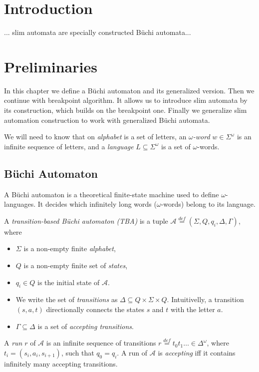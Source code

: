 \documentclass[
	digital
nolof, nolot
]{fithesis3}
\newcommand{\cA}{\mathcal{A}}
\newcommand{\eqdef}{\overset{def}{=}}
\begin{document}
	\chapter{Introduction}
	... slim automata are specially constructed Büchi automata...
	\chapter{Preliminaries}
		In this chapter we define a Büchi automaton and its generalized version.
		Then we continue with breakpoint algorithm. It allows us to introduce slim automata by its construction, which builds on the breakpoint one. Finally we generalize slim automation construction to work with generalized Büchi automata.
		
		We will need to know that on \emph{alphabet} is a set of letters, an \emph{$\omega$-word} $w \in \Sigma^\omega$ is an infinite sequence of letters, and a \emph{language} $L \subseteq \Sigma^\omega$ is a set of $\omega$-words.
		\section{Büchi Automaton}
			A Büchi automaton is a theoretical finite-state machine used to define $\omega$-languages. It decides which infinitely long words ($\omega$-words) belong to its language.
			
			A \emph{transition-based Büchi automaton (TBA)} is a tuple $\cA\eqdef(\Sigma, Q, q_i, \Delta, \Gamma)$, where 
			\begin{itemize}
				\item $\Sigma$ is a non-empty finite \emph{alphabet},
				\item $Q$ is a non-empty finite set of \emph{states},
				\item $q_i \in Q$ is the initial state of $\cA$.
				\item We write the set of \emph{transitions} as $\Delta \subseteq Q \times \Sigma \times Q$. Intuitivelly, a transition $(s, a, t)$  directionally connects the states $s$ and $t$ with the letter $a$.
				\item $\Gamma \subseteq \Delta$ is a set of \emph{accepting transitions}.
			\end{itemize}
			
			A \emph{run} $r$ of $\cA$ is an infinite sequence of transitions
			$r\eqdef t_0t_1\ldots\in\Delta^\omega$, where $t_i=(s_i, a_i,s_{i+1})$,
			 such that $q_0=q_i$.
			A run of $\cA$ is \emph{accepting} iff it contains infinitely many accepting transitions.
\end{document}
